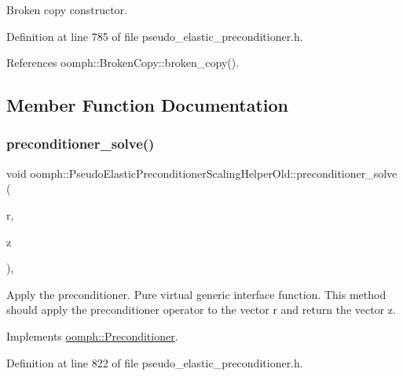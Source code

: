 Broken copy constructor. 



Definition at line 785 of file pseudo\+\_\+elastic\+\_\+preconditioner.\+h.



References oomph\+::\+Broken\+Copy\+::broken\+\_\+copy().



\subsection{Member Function Documentation}
\mbox{\label{classoomph_1_1PseudoElasticPreconditionerScalingHelperOld_a185bc08ce33f220d9ef61745b46e0633}} 
\subsubsection{\texorpdfstring{preconditioner\+\_\+solve()}{preconditioner\_solve()}}
{\footnotesize\ttfamily void oomph\+::\+Pseudo\+Elastic\+Preconditioner\+Scaling\+Helper\+Old\+::preconditioner\+\_\+solve (\begin{DoxyParamCaption}\item[{const \hyperlink{classoomph_1_1DoubleVector}{Double\+Vector} \&}]{r,  }\item[{\hyperlink{classoomph_1_1DoubleVector}{Double\+Vector} \&}]{z }\end{DoxyParamCaption})\hspace{0.3cm}{\ttfamily [inline]}, {\ttfamily [virtual]}}



Apply the preconditioner. Pure virtual generic interface function. This method should apply the preconditioner operator to the vector r and return the vector z. 



Implements \hyperlink{classoomph_1_1Preconditioner_ace1199369e4465cd2b9a34884bb64ec8}{oomph\+::\+Preconditioner}.



Definition at line 822 of file pseudo\+\_\+elastic\+\_\+preconditioner.\+h.

